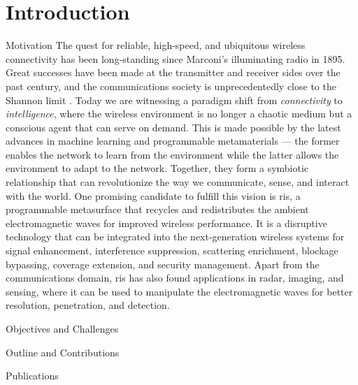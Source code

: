 
\graphicspath{{assets/chapter_1/}}

\chapter{Introduction}

\begin{section}{Motivation}
	The quest for reliable, high-speed, and ubiquitous wireless connectivity has been long-standing since Marconi's illuminating radio in 1895.
	Great successes have been made at the transmitter and receiver sides over the past century, and the communications society is unprecedentedly close to the Shannon limit \cite{Shannon1948}.
	Today we are witnessing a paradigm shift from \emph{connectivity} to \emph{intelligence}, where the wireless environment is no longer a chaotic medium but a conscious agent that can serve on demand.
	This is made possible by the latest advances in machine learning and programmable metamaterials --- the former enables the network to learn from the environment while the latter allows the environment to adapt to the network.
	Together, they form a symbiotic relationship that can revolutionize the way we communicate, sense, and interact with the world.
	One promising candidate to fulfill this vision is \gls{ris}, a programmable metasurface that recycles and redistributes the ambient electromagnetic waves for improved wireless performance.
	It is a disruptive technology that can be integrated into the next-generation wireless systems for signal enhancement, interference suppression, scattering enrichment, blockage bypassing, coverage extension, and security management.
	Apart from the communications domain, \gls{ris} has also found applications in radar, imaging, and sensing, where it can be used to manipulate the electromagnetic waves for better resolution, penetration, and detection.

\end{section}

\begin{section}{Objectives and Challenges}

\end{section}

\begin{section}{Outline and Contributions}

\end{section}

\begin{section}{Publications}

\end{section}

